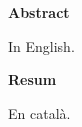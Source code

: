 \thispagestyle{plain}                                   %

\begin{center}
    {\Large\bfseries\sffamily  Abstract}
\end{center}

\vspace{0.5em}

In English.

\lipsum[1]

\vspace{2em}

\begin{center}
    {\Large\bfseries\sffamily Resum}
\end{center}

\vspace{0.5em}

En català.

\lipsum[1]

\restoregeometry